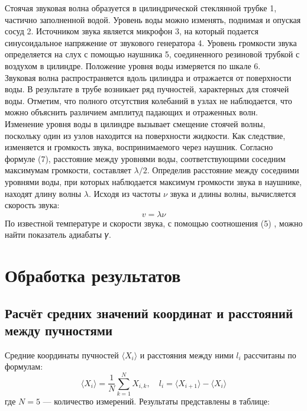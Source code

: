 \documentclass[a4paper]{article}
\begin{document}
Стоячая звуковая волна образуется в цилиндрической стеклянной трубке 1, частично заполненной водой. Уровень воды можно изменять, поднимая и опуская сосуд 2. Источником звука является микрофон 3, на который подается синусоидальное напряжение от звукового генератора 4. Уровень громкости звука
определяется на слух с помощью наушника 5, соединенного резиновой трубкой с воздухом в цилиндре. Положение уровня воды
измеряется по шкале 6.\\
Звуковая волна распространяется вдоль цилиндра и отражается от поверхности воды. В результате в трубе возникает ряд
пучностей, характерных для стоячей воды. Отметим, что полного
отсутствия колебаний в узлах не наблюдается, что можно объяснить различием амплитуд падающих и отраженных волн.\\
Изменение уровня воды в цилиндре вызывает смещение стоячей волны, поскольку один из узлов находится на поверхности
жидкости. Как следствие, изменяется и громкость звука, воспринимаемого через наушник. Согласно формуле (7), расстояние
между уровнями воды, соответствующими соседним максимумам
громкости, составляет $\lambda/2$. Определив расстояние между соседними уровнями воды, при которых наблюдается максимум громкости звука в наушнике, находят длину волны $\lambda$. Исходя из частоты $\nu$ звука и длины волны, вычисляется скорость звука:
\begin{equation}
    v = \lambda \nu
\end{equation}
По известной температуре и скорости звука, с помощью соотношения (5) , можно найти показатель адиабаты 𝛾.


\section{Обработка результатов}
\subsection{Расчёт средних значений координат и расстояний между пучностями}
Средние координаты пучностей \( \langle X_i \rangle \) и расстояния между ними \( l_i \) рассчитаны по формулам:
\[
\langle X_i \rangle = \frac{1}{N} \sum_{k=1}^N X_{i,k}, \quad l_i = \langle X_{i+1} \rangle - \langle X_i \rangle
\]
где \( N = 5 \) — количество измерений. Результаты представлены в таблице:
\end{document}
